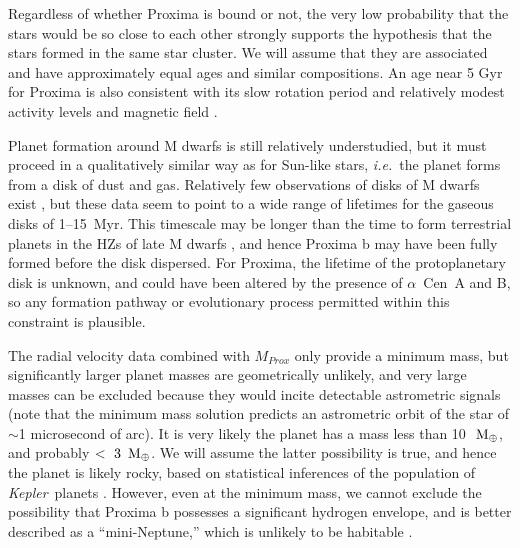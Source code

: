 \documentclass[preprint,12pt]{aastex}
\def\mearth{{\rm\,M_\oplus}}
\def\eg{{\it e.g.\ }}
\def\ie{{\it i.e.\ }}
\def\acen{{$\alpha$~Cen}}
\def\kepler{{\it Kepler}}
\begin{document}
Regardless of whether Proxima is bound or not, the very low
probability that the stars would be so close to each other strongly
supports the hypothesis that the stars formed in the same star
cluster. We will assume that they are associated and have
approximately equal ages and similar compositions. An age near 5 Gyr
for Proxima is also consistent with its slow rotation period and relatively
modest activity levels and magnetic field \citep{ReinersBasri08}. 

Planet formation around M dwarfs is still relatively understudied, but
it must proceed in a qualitatively similar way as for Sun-like stars,
\ie the planet forms from a disk of dust and gas. Relatively few
observations of disks of M dwarfs exist
\citep[\eg][]{Hernandez07,WilliamsCieza11,Luhman12,Downes15}, but
these data seem to point to a wide range of lifetimes for the gaseous
disks of 1--15~Myr. This timescale may be longer than the time to form
terrestrial planets in the HZs of late M dwarfs
\citep{Raymond07,Lissauer07}, and hence Proxima b may have been fully
formed before the disk dispersed. For Proxima, the lifetime of the
protoplanetary disk is unknown, and could have been altered by the
presence of \acen~A and B, so any formation pathway or evolutionary
process permitted within this constraint is plausible.

The radial velocity data combined with $M_{Prox}$ only provide a
minimum mass, but significantly larger planet masses are geometrically
unlikely, and very large masses can be excluded because they would
incite detectable astrometric signals (note that the minimum mass
solution predicts an astrometric orbit of the star of $\sim$1
microsecond of arc). It is very likely the planet has a mass less than
10~$\mearth$, and probably $<~3~\mearth$. We will assume the latter
possibility is true, and hence the planet is likely rocky, based on
statistical inferences of the population of \kepler~planets
\citep{WeissMarcy14,Rogers15}. However, even at the minimum mass, we
cannot exclude the possibility that Proxima b possesses a significant
hydrogen envelope, and is better described as a ``mini-Neptune,''
which is unlikely to be habitable \citep[but
  see][]{PierrehumbertGaidos11}.
\end{document}
